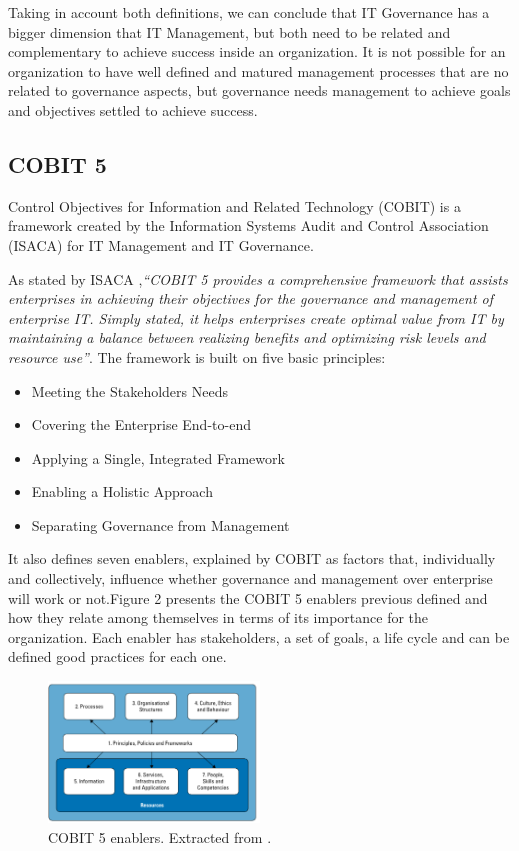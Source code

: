  Taking in account both definitions, we can conclude that IT Governance has a bigger dimension that IT Management, but both need to be related and complementary to achieve success inside an organization. It is not possible for an organization to have well defined and matured management processes that are no related to governance aspects, but governance needs management to achieve goals and objectives settled to achieve success.

\subsection{COBIT 5}

Control Objectives for Information and Related Technology (COBIT) is a framework created by the Information Systems Audit and Control Association (ISACA) for IT Management and IT Governance.\par
As stated by ISACA \cite{2012cobit},\textit{``COBIT 5 provides a comprehensive framework that assists enterprises in achieving their objectives for the governance and management of enterprise IT. Simply stated, it helps enterprises create optimal value from IT by maintaining a balance between realizing benefits and optimizing risk levels and resource use''}. The framework is built on five basic principles:

\begin{itemize}
  \item Meeting the Stakeholders Needs 
  \item Covering the Enterprise End-to-end
  \item Applying a Single, Integrated Framework
  \item Enabling a Holistic Approach
  \item Separating Governance from Management
\end{itemize}


It also defines seven enablers, explained by COBIT as factors that, individually and collectively, influence whether governance and management over enterprise will work or not.Figure 2 presents the COBIT 5 enablers previous defined and how they relate among themselves in terms of its importance for the organization. Each enabler has stakeholders, a set of goals, a life cycle and can be defined good practices for each one.\par

\begin{figure}
\centering
\includegraphics[width=0.5\textwidth]{img/Enablers.png}
\caption{COBIT 5 enablers. Extracted from \cite{2012cobit}.}
\end{figure}




